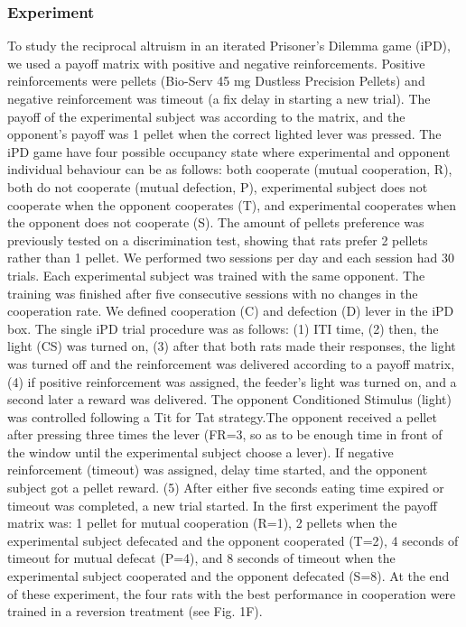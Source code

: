 \documentclass[10pt,letterpaper]{article}
\begin{document}
\subsubsection*{Experiment}
To study the reciprocal altruism in an iterated Prisoner's Dilemma game (iPD), we used a payoff matrix with positive and negative reinforcements. Positive reinforcements were pellets (Bio-Serv 45 mg Dustless Precision Pellets) and negative reinforcement was timeout (a fix delay in starting a new trial). The payoff of the experimental subject was according to the matrix, and the opponent's payoff was 1 pellet when the correct lighted lever was pressed. The iPD game have four possible occupancy state where experimental and opponent individual behaviour can be as follows: both cooperate (mutual cooperation, R), both do not cooperate (mutual defection, P), experimental subject does not cooperate when the opponent cooperates (T), and experimental cooperates when the opponent does not cooperate (S). The amount of pellets preference was previously tested on a discrimination test, showing that rats prefer 2 pellets rather than 1 pellet. We performed two sessions per day and each session had 30 trials. Each experimental subject was trained with the same opponent. The training was finished after five consecutive sessions with no changes in the cooperation rate. We defined cooperation (C)  and defection (D) lever in the iPD box. The single iPD trial procedure was as follows: (1) ITI time, (2) then, the light (CS) was turned on, (3) after that both rats made their responses, the light was turned off and the reinforcement was delivered according to a payoff matrix, (4) if positive reinforcement was assigned, the feeder's light was turned on, and a second later a reward was delivered. The opponent Conditioned Stimulus (light) was controlled following a Tit for Tat strategy.The opponent received a pellet after pressing three times the lever (FR=3, so as to be enough time in front of the window until the experimental subject choose a lever). If negative reinforcement (timeout) was assigned, delay time started, and the opponent subject got a pellet reward. (5) After either five seconds eating time expired or timeout was completed, a new trial started. In the first experiment the payoff matrix was: 1 pellet for mutual cooperation (R=1), 2 pellets when the experimental subject defecated and the opponent cooperated (T=2), 4 seconds of timeout for mutual defecat (P=4), and 8 seconds of timeout when the experimental subject cooperated and the opponent defecated (S=8). 
At the end of these experiment, the four rats with the best performance in cooperation were trained in a reversion treatment (see Fig. 1F).
\end{document}
